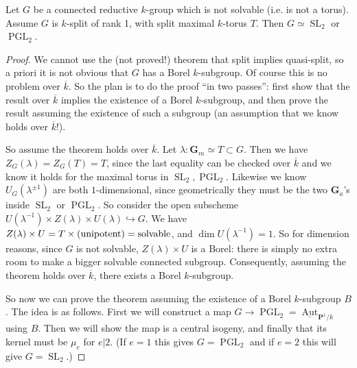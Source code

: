 \documentclass[10pt]{article}
\renewcommand{\(}{\left(}
\renewcommand{\)}{\right)}
\numberwithin{thm}{subsection}
\begin{document}
\begin{thm}\label{}
Let $G$ be a connected reductive $k$-group which is not solvable (i.e. is not a torus).
Assume $G$ is $k$-split of rank 1, with split maximal $k$-torus $T$.
Then $G\simeq \operatorname{SL}_2$ or $\operatorname{PGL}_2$.
\end{thm}
\begin{proof}
We cannot use the (not proved!) theorem that split implies quasi-split,
so a priori it is not obvious that $G$ has a Borel $k$-subgroup. 
Of course this is no problem over $\overline{k}$.
So the plan is to do the proof ``in two passes'':
first show that the result over $\overline{k}$
implies the existence of a Borel $k$-subgroup,
and then prove the result assuming the existence of such a subgroup
(an assumption that we know holds over $\overline{k}$!). 

So assume the theorem holds over $\overline{k}$.
Let $\lambda:\mathbf{G}_m\simeq  T\subset G$.
Then we have $Z_G(\lambda)=Z_G(T)=T$,
since the last equality can be checked over $\overline{k}$
and we know it holds for the maximal torus in $\operatorname{SL}_2,\operatorname{PGL}_2$.
Likewise we know $U_G(\lambda^{\pm 1})$ are both $1$-dimensional,
since geometrically they must be the two $\mathbf{G}_a$'s inside $\operatorname{SL}_2$ or $\operatorname{PGL}_2$.
So consider the open subscheme $U(\lambda^{-1})\times Z(\lambda)\times U(\lambda)\hookrightarrow G$.
We have $Z(\lambda)\times U = T\times ({\rm{unipotent}}) = {\rm{solvable}}$,
and $\dim U(\lambda^{-1})=1$.
So for dimension reasons, since $G$ is not solvable,
$Z(\lambda)\times U$ is a Borel: there is simply no extra room to make a bigger solvable connected subgroup.
Consequently, assuming the theorem holds over $\overline{k}$,
there exists a Borel $k$-subgroup. 

So now we can prove the theorem assuming the existence of a Borel $k$-subgroup $B$. 
The idea is as follows. First we will construct a map $G\rightarrow
\operatorname{PGL}_2=\underline{\operatorname{Aut}}_{\mathbf{P}^1/k}$ 
using $B$.
Then we will show the  map is a central isogeny,
and finally that its kernel must be $\mu_e$ for $e|2$. (If $e=1$ this
gives $G=\operatorname{PGL}_2$ and if $e=2$ this will give $G=\operatorname{SL}_2$.)


\end{proof}
\end{document}
